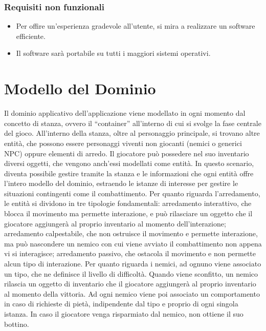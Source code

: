 \documentclass[a4paper,12pt]{report}
\begin{document}
\subsubsection{Requisiti non funzionali}
\begin{itemize}
	\item Per offire un'esperienza gradevole all'utente, si mira a realizzare un software efficiente.
	\item Il software sarà portabile su tutti i maggiori sistemi operativi.
\end{itemize}


\section{Modello del Dominio}

Il dominio applicativo dell’applicazione viene modellato in ogni momento dal concetto di stanza, ovvero il “container” all’interno di cui si svolge la fase centrale del gioco. All’interno della stanza, oltre al personaggio principale, si trovano altre entità, che possono essere personaggi viventi non giocanti (nemici o generici NPC) oppure elementi di arredo. Il giocatore può possedere nel suo inventario diversi oggetti, che vengono anch’essi modellati come entità. In questo scenario, diventa possibile gestire tramite la stanza e le informazioni che ogni entità offre l’intero modello del dominio, estraendo le istanze di interesse per gestire le situazioni contingenti come il combattimento. 
%
\newline Per quanto riguarda l’arredamento, le entità si dividono in tre tipologie fondamentali: arredamento interattivo, che blocca il movimento ma permette interazione, e può rilasciare un oggetto che il giocatore aggiungerà al proprio inventario al momento dell’interazione; arredamento calpestabile, che non ostruisce il movimento e permette interazione, ma può nascondere un nemico con cui viene avviato il combattimento non appena vi si interagisce; arredamento passivo, che ostacola il movimento e non permette alcun tipo di interazione. 
%
\newline Per quanto riguarda i nemici, ad ognuno viene associato un tipo, che ne definisce il livello di difficoltà. Quando viene sconfitto, un nemico rilascia un oggetto di inventario che il giocatore aggiungerà al proprio inventario al momento della vittoria. Ad ogni nemico viene poi associato un comportamento in caso di richieste di pietà, indipendente dal tipo e proprio di ogni singola istanza. In caso il giocatore venga risparmiato dal nemico, non ottiene il suo bottino.
\end{document}
